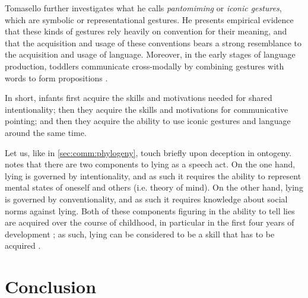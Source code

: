 Tomasello further investigates what he calls \emph{pantomiming} or \emph{iconic gestures}, which are symbolic or representational gestures. 
He presents empirical evidence that these kinds of gestures rely heavily on convention for their meaning, and that the acquisition and usage of these conventions bears a strong resemblance to the acquisition and usage of language.
Moreover, in the early stages of language production, toddlers communicate cross-modally by combining gestures with words to form propositions \citep{Iverson05}.

In short, infants first acquire the skills and motivations needed for shared intentionality; then they acquire the skills and motivations for communicative pointing; and then they acquire the ability to use iconic gestures and language around the same time.

Let us, like in \cref{sec:comm:phylogeny}, touch briefly upon deception in ontogeny. \citet{Lee13} notes that there are two components to lying as a speech act. On the one hand, lying is governed by intentionality, and as such it requires the ability to represent mental states of oneself and others (i.e. theory of mind). On the other hand, lying is governed by conventionality, and as such it requires knowledge about social norms against lying.
Both of these components figuring in the ability to tell lies are acquired over the course of childhood, in particular in the first four years of development \citep{Lee13}; as such, lying can be considered to be a skill that has to be acquired \citep{Meibauer18}.



\section{Conclusion}
